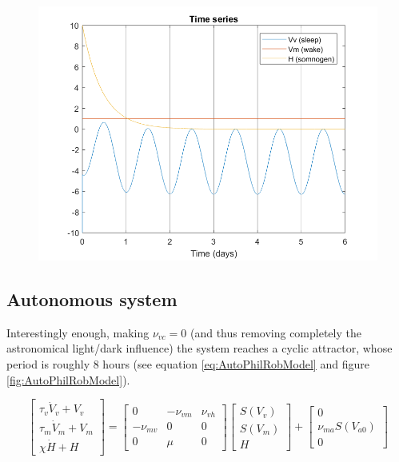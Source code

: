 \documentclass[a4paper, onecolumn, 10pt]{article}
\begin{document}
\begin{figure}[h]
	\begin{center}
		\includegraphics[width=1\columnwidth]{uncoupled.png}
	\end{center}
	\caption{}
	\label{fig:Uncoupled}
\end{figure}

\clearpage
\subsection{Autonomous system}
Interestingly enough, making $\nu_{vc} = 0$ (and thus removing completely the astronomical light/dark influence) the system reaches a cyclic attractor, whose period is roughly $8$ hours (see equation \ref{eq:AutoPhilRobModel} and figure \ref{fig:AutoPhilRobModel}).

\begin{equation}
\label{eq:AutoPhilRobModel}
\left[
\begin{array}{c}
\tau_v \dot V_v + V_v \\ 
\tau_m \dot V_m + V_m \\ 
\chi \dot H + H
\end{array}
\right]
=
\left[
\begin{array}{ccc}
0 & -\nu_{vm} & \nu_{vh} \\ 
-\nu_{mv} & 0 & 0 \\ 
0 & \mu & 0
\end{array}
\right] 
\left[
\begin{array}{c}
S(V_v) \\ 
S(V_m) \\ 
H
\end{array}
\right]
+
\left[
\begin{array}{c}
0 \\ 
\nu_{ma} S(V_{a0}) \\ 
0
\end{array}
\right]
\end{equation}
\end{document}
